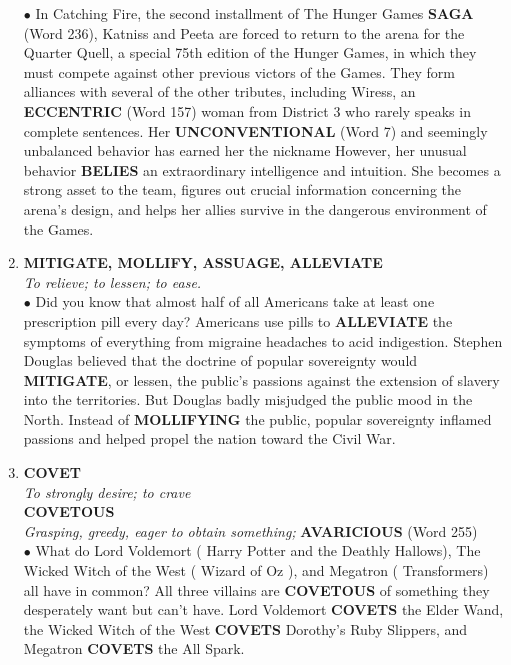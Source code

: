 \documentclass{book}
\begin{document}
\begin{enumerate}
$\bullet$ In Catching Fire, the second installment of The Hunger Games \textbf{SAGA} (Word 236), Katniss and Peeta are forced to return to the arena for the Quarter Quell, a special 75th edition of the Hunger Games, in which they must compete against other previous victors of the Games. They form alliances with several of the other tributes, including Wiress, an \textbf{ECCENTRIC} (Word 157) woman from District 3 who rarely speaks in complete sentences. Her \textbf{UNCONVENTIONAL} (Word 7) and seemingly unbalanced behavior has earned her the nickname  However, her unusual behavior \textbf{BELIES} an extraordinary intelligence and intuition. She becomes a strong asset to the team, figures out crucial information concerning the arena's design, and helps her allies survive in the dangerous environment of the Games.

\item \textbf{MITIGATE, MOLLIFY, ASSUAGE, ALLEVIATE}\\ \textit{To relieve; to lessen; to ease.}\\

$\bullet$ Did you know that almost half of all Americans take at least one prescription pill every day? Americans use pills to \textbf{ALLEVIATE} the symptoms of everything from migraine headaches to acid indigestion. Stephen Douglas believed that the doctrine of popular sovereignty would \textbf{MITIGATE}, or lessen, the public's passions against the extension of slavery into the territories. But Douglas badly misjudged the public mood in the North. Instead of \textbf{MOLLIFYING} the public, popular sovereignty inflamed passions and helped propel the nation toward the Civil War.

\item \textbf{COVET}\\
\textit{To strongly desire; to crave}\\ \textbf{COVETOUS}\\ \textit{Grasping, greedy, eager to obtain something;} \textbf{AVARICIOUS} (Word 255)\\
 
$\bullet$ What do Lord Voldemort ( Harry Potter and the Deathly Hallows), The Wicked Witch of the West ( Wizard of Oz ), and Megatron ( Transformers) all have in common? All three villains are \textbf{COVETOUS} of something they desperately want but can’t have. Lord Voldemort \textbf{COVETS} the Elder Wand, the Wicked Witch of the West \textbf{COVETS} Dorothy's Ruby Slippers, and Megatron \textbf{COVETS} the All Spark.


\end{enumerate}
\end{document}
